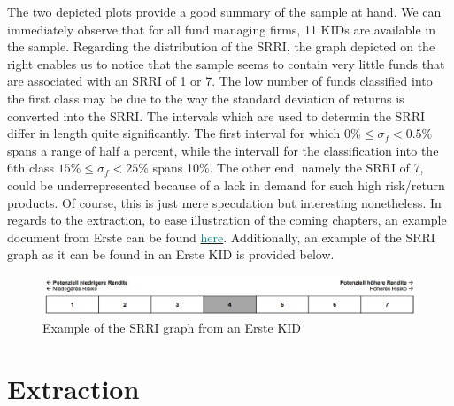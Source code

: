 \documentclass[aodsor,preprint]{imsart}
\numberwithin{equation}{section}
\theoremstyle{plain}
\begin{document}
The two depicted plots provide a good summary of the sample at hand. We can immediately observe that for all fund managing firms, 11 KIDs are available in the sample. Regarding the distribution of the SRRI, the graph depicted on the right enables us to notice that the sample seems to contain very little funds that are associated with an SRRI of 1 or 7. The low number of funds classified into the first class may be due to the way the standard deviation of returns is converted into the SRRI. The intervals which are used to determin the SRRI differ in length quite significantly. The first interval for which $0\% \leq\sigma_f<0.5\%$ spans a range of half a percent, while the intervall for the classification into the 6th class $15\%\leq\sigma_f<25\%$ spans 10\%. The other end, namely the SRRI of 7, could be underrepresented because of a lack in demand for such high risk/return products. Of course, this is just mere speculation but interesting nonetheless.
In regards to the extraction, to ease illustration of the coming chapters, an example document from Erste can be found \href{https://github.com/Base-R-Best-R/KID/blob/main/KIDs/Erste/kid-eb-147-t2957-at_de-de_en_4.pdf}{\textcolor{teal}{here}}. Additionally, an example of the SRRI graph as it can be found in an Erste KID is provided below.

\begin{figure}[H]
	\includegraphics[width = 12cm]{example_SRRI_graph}
	\caption{Example of the SRRI graph from an Erste KID}
\end{figure}


\section{Extraction}
\end{document}
